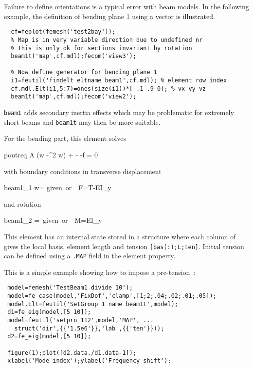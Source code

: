 \begin{SDT}

Failure to define orientations is a typical error with beam models. In the following example, the definition of bending plane 1 using a vector is illustrated. 
\begin{verbatim}
  cf=feplot(femesh('test2bay'));
  % Map is in very variable direction due to undefined nr
  % This is only ok for sections invariant by rotation
  beam1t('map',cf.mdl);fecom('view3'); 
  
  % Now define generator for bending plane 1
  i1=feutil('findelt eltname beam1',cf.mdl); % element row index
  cf.mdl.Elt(i1,5:7)=ones(size(i1))*[-.1 .9 0]; % vx vy vz
  beam1t('map',cf.mdl);fecom('view2'); 
\end{verbatim}%

\end{SDT}

{\tt beam1} adds secondary inertia effects which may be problematic for extremely short beams and {\tt beam1t} may then be more suitable.


For the bending part, this element solves
%
\begin{eqsvg}{poutreq}
\rho A (\ddot w -\Omega^2 w) + 
-  -f = 0 
\end{eqsvg}
%
with boundary conditions in transverse displacement
%
\begin{eqsvg}{beam1_1}
w= \hbox{given or}\ \ F=T-EI_y
\end{eqsvg}
%
and rotation
%
\begin{eqsvg}{beam1_2}
=\ \hbox{given or}\ \ M=EI_y
\end{eqsvg}


This element has an internal state stored in a  structure where each column of  gives the local basis, element length and tension {\tt [bas(:);L;ten]}. Initial tension can be defined using a {\tt .MAP} field in the element property. 

This is a simple example showing how to impose a pre-tension~:

\begin{verbatim}
 model=femesh('TestBeam1 divide 10');
 model=fe_case(model,'FixDof','clamp',[1;2;.04;.02;.01;.05]);
 model.Elt=feutil('SetGroup 1 name beam1t',model);
 d1=fe_eig(model,[5 10]); 
 model=feutil('setpro 112',model,'MAP', ...
   struct('dir',{{'1.5e6'}},'lab',{{'ten'}}));
 d2=fe_eig(model,[5 10]); 

 figure(1);plot([d2.data./d1.data-1]);
 xlabel('Mode index');ylabel('Frequency shift');
\end{verbatim}%


